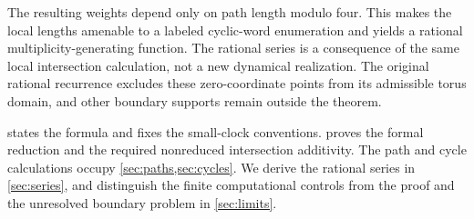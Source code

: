 The resulting weights depend only on path length modulo four. This makes
the local lengths amenable to a labeled cyclic-word enumeration and yields
a rational multiplicity-generating function. The rational series is a
consequence of the same local intersection calculation, not a new
dynamical realization. The original rational recurrence excludes these
zero-coordinate points from its admissible torus domain, and other
boundary supports remain outside the theorem.

 states the formula and fixes the small-clock conventions.
 proves the formal reduction and the required nonreduced
intersection additivity. The path and cycle calculations occupy
\cref{sec:paths,sec:cycles}. We derive the rational series in
\cref{sec:series}, and distinguish the finite computational controls from
the proof and the unresolved boundary problem in \cref{sec:limits}.
